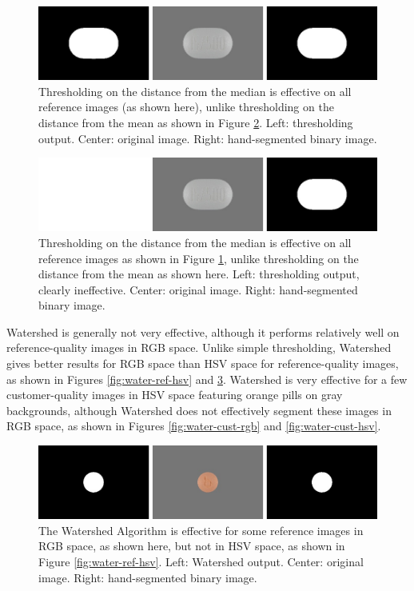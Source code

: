 \documentclass{article}
\begin{document}
\begin{figure}
    \includegraphics[width=\linewidth]{images/dist_med_compare.jpg}
    \caption{Thresholding on the distance from the median is effective on all reference images (as shown here), unlike thresholding on the distance from the mean as shown in Figure \ref{fig:dist-mean-compare}. Left: thresholding output. Center: original image. Right: hand-segmented binary image.}
    \label{fig:dist-med-compare}
\end{figure}

\begin{figure}
    \includegraphics[width=\linewidth]{images/dist_mean_compare.jpg}
    \caption{Thresholding on the distance from the median is effective on all reference images as shown in Figure \ref{fig:dist-med-compare}, unlike thresholding on the distance from the mean as shown here. Left: thresholding output, clearly ineffective. Center: original image. Right: hand-segmented binary image.}
    \label{fig:dist-mean-compare}
\end{figure}

Watershed is generally not very effective, although it performs relatively well on reference-quality images in RGB space. Unlike simple thresholding, Watershed gives better results for RGB space than HSV space for reference-quality images, as shown in Figures \ref{fig:water-ref-hsv} and \ref{fig:water-ref-rgb}. Watershed is very effective for a few customer-quality images in HSV space featuring orange pills on gray backgrounds, although Watershed does not effectively segment these images in RGB space, as shown in Figures \ref{fig:water-cust-rgb} and \ref{fig:water-cust-hsv}.

\begin{figure}
    \includegraphics[width=\linewidth]{images/water_ref_rgb.jpg}
    \caption{The Watershed Algorithm is effective for some reference images in RGB space, as shown here, but not in HSV space, as shown in Figure \ref{fig:water-ref-hsv}. Left: Watershed output. Center: original image. Right: hand-segmented binary image.}
    \label{fig:water-ref-rgb}
\end{figure}
\end{document}
